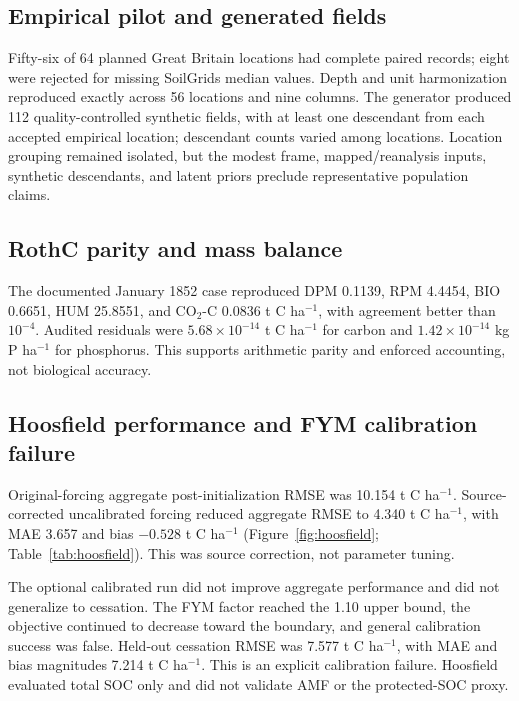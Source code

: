 \documentclass[11pt]{article}
\newcommand{\unitC}{t C ha$^{-1}$}
\newcommand{\unitP}{kg P ha$^{-1}$}
\begin{document}
\subsection{Empirical pilot and generated fields}

Fifty-six of 64 planned Great Britain locations had complete paired records; eight were rejected for missing SoilGrids median values. Depth and unit harmonization reproduced exactly across 56 locations and nine columns. The generator produced 112 quality-controlled synthetic fields, with at least one descendant from each accepted empirical location; descendant counts varied among locations. Location grouping remained isolated, but the modest frame, mapped/reanalysis inputs, synthetic descendants, and latent priors preclude representative population claims.

\subsection{RothC parity and mass balance}

The documented January 1852 case reproduced DPM 0.1139, RPM 4.4454, BIO 0.6651, HUM 25.8551, and CO$_2$-C 0.0836 \unitC{}, with agreement better than $10^{-4}$. Audited residuals were $5.68\times10^{-14}$ \unitC{} for carbon and $1.42\times10^{-14}$ \unitP{} for phosphorus. This supports arithmetic parity and enforced accounting, not biological accuracy.

\subsection{Hoosfield performance and FYM calibration failure}

Original-forcing aggregate post-initialization RMSE was 10.154 \unitC. Source-corrected uncalibrated forcing reduced aggregate RMSE to 4.340 \unitC{}, with MAE 3.657 and bias $-0.528$ \unitC{} (Figure~\ref{fig:hoosfield}; Table~\ref{tab:hoosfield}). This was source correction, not parameter tuning.

The optional calibrated run did not improve aggregate performance and did not generalize to cessation. The FYM factor reached the 1.10 upper bound, the objective continued to decrease toward the boundary, and general calibration success was false. Held-out cessation RMSE was 7.577 \unitC{}, with MAE and bias magnitudes 7.214 \unitC. This is an explicit calibration failure. Hoosfield evaluated total SOC only and did not validate AMF or the protected-SOC proxy.
\end{document}
